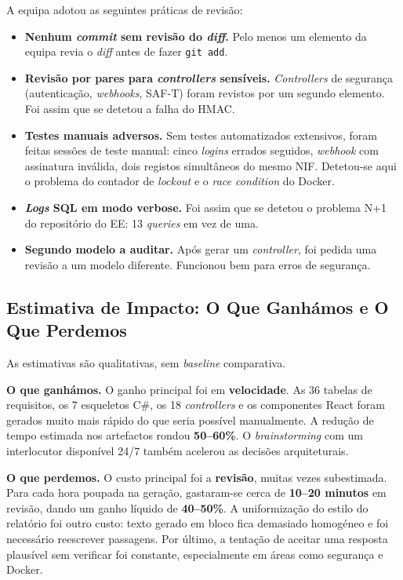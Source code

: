 A equipa adotou as seguintes práticas de revisão:

\begin{itemize}
    \item \textbf{Nenhum \textit{commit} sem revisão do \textit{diff}.} Pelo menos um elemento da equipa revia o \textit{diff} antes de fazer \texttt{git add}.

    \item \textbf{Revisão por pares para \textit{controllers} sensíveis.} \textit{Controllers} de segurança (autenticação, \textit{webhooks}, SAF-T) foram revistos por um segundo elemento. Foi assim que se detetou a falha do HMAC.

    \item \textbf{Testes manuais adversos.} Sem testes automatizados extensivos, foram feitas sessões de teste manual: cinco \textit{logins} errados seguidos, \textit{webhook} com assinatura inválida, dois registos simultâneos do mesmo NIF. Detetou-se aqui o problema do contador de \textit{lockout} e o \textit{race condition} do Docker.

    \item \textbf{\textit{Logs} SQL em modo verbose.} Foi assim que se detetou o problema N+1 do repositório do EE: 13 \textit{queries} em vez de uma.

    \item \textbf{Segundo modelo a auditar.} Após gerar um \textit{controller}, foi pedida uma revisão a um modelo diferente. Funcionou bem para erros de segurança.
\end{itemize}

\subsection{Estimativa de Impacto: O Que Ganhámos e O Que Perdemos}\label{subsec:ia_val_impacto}

As estimativas são qualitativas, sem \textit{baseline} comparativa.

\textbf{O que ganhámos.} O ganho principal foi em \textbf{velocidade}. As 36 tabelas de requisitos, os 7 esqueletos C\#, os 18 \textit{controllers} e os componentes React foram gerados muito mais rápido do que seria possível manualmente. A redução de tempo estimada nos artefactos rondou \textbf{50--60\%}. O \textit{brainstorming} com um interlocutor disponível 24/7 também acelerou as decisões arquiteturais.

\textbf{O que perdemos.} O custo principal foi a \textbf{revisão}, muitas vezes subestimada. Para cada hora poupada na geração, gastaram-se cerca de \textbf{10--20 minutos} em revisão, dando um ganho líquido de \textbf{40--50\%}. A uniformização do estilo do relatório foi outro custo: texto gerado em bloco fica demasiado homogéneo e foi necessário reescrever passagens. Por último, a tentação de aceitar uma resposta plausível sem verificar foi constante, especialmente em áreas como segurança e Docker.

